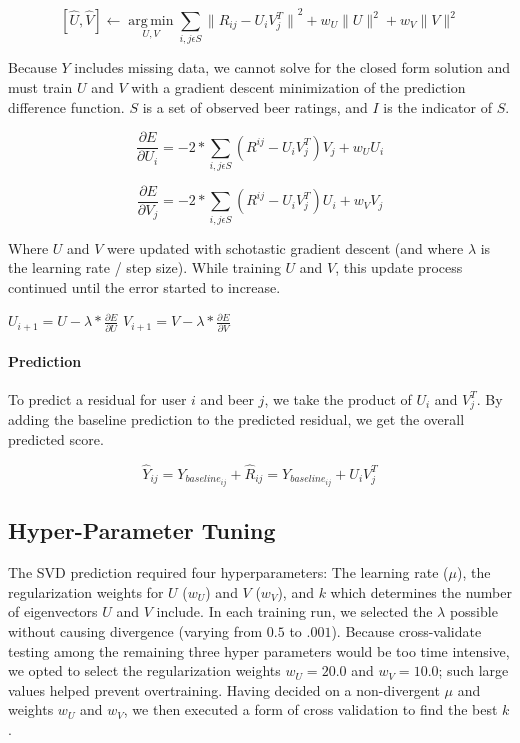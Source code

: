 \documentclass[12pt]{article}
\DeclareMathOperator*{\argmin}{arg\,min}
\begin{document}
$$ [\hat{U}, \hat{V}] \leftarrow \argmin\limits_{U,V}\sum\limits_{i,j \epsilon S} {\|R_{ij} - U_i V_j^T\|}^2 + w_U\|U\|^2 + w_V\|V\|^2$$

Because $Y$ includes missing data, we cannot solve for the closed form solution and must train $U$ and $V$ with a gradient descent minimization of the prediction difference function. $S$ is a set of observed beer ratings, and $I$ is the indicator of $S$.

$$ \frac{\partial E}{\partial U_i} = -2 * \sum\limits_{i,j \epsilon S} (R^{ij} - U_i V_j^T) V_j + w_U U_i$$


$$ \frac{\partial E}{\partial V_j} = -2 * \sum\limits_{i,j \epsilon S} (R^{ij} - U_i V_j^T) U_i + w_V V_j$$


Where $U$ and $V$ were updated with schotastic gradient descent (and where $\lambda$ is the learning rate / step size). While training $U$ and $V$, this update process continued until the error started to increase.

\begin{center}
$ U_{i+1} = U - \lambda * \frac{\partial E}{\partial U}$ \hspace{2cm} $V_{i+1} = V - \lambda * \frac{\partial E}{\partial V}$
\end{center}

\paragraph{Prediction} To predict a residual for user $i$ and beer $j$, we take the product of $U_i$ and $V_j^T$. By adding the baseline prediction to the predicted residual, we get the overall predicted score.

$$ \hat{Y}_{ij} = Y_{baseline_{ij}} + \hat{R}_{ij} = Y_{baseline_{ij}} + U_i V_j^T $$


\subsection*{Hyper-Parameter Tuning}
The SVD prediction required four hyperparameters: The learning rate ($\mu$), the regularization weights for $U$ ($w_U$) and $V$ ($w_V$), and $k$ which determines the number of eigenvectors $U$ and $V$ include. In each training run, we selected the $\lambda$ possible without causing divergence (varying from $0.5$ to $.001$). Because cross-validate testing among the remaining three hyper parameters would be too time intensive, we opted to select the regularization weights $w_U = 20.0$ and $w_V = 10.0$; such large values helped prevent overtraining. Having decided on a non-divergent $\mu$ and weights $w_U$ and $w_V$, we then executed a form of cross validation to find the best $k$.
\end{document}
